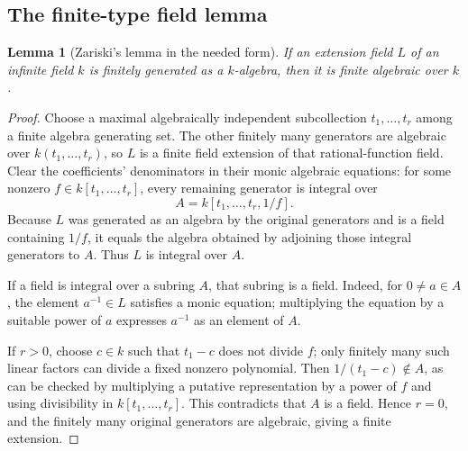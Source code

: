 \documentclass[11pt,letterpaper]{article}
\numberwithin{equation}{section}
\newtheorem{lemma}[lemma]{Lemma}
\theoremstyle{definition}
\theoremstyle{remark}
\begin{document}
\subsection{The finite-type field lemma}
\begin{lemma}[Zariski's lemma in the needed form]\label{lem:zariski}
If an extension field $L$ of an infinite field $k$ is finitely generated
as a $k$-algebra, then it is finite algebraic over $k$.
\end{lemma}
\begin{proof}
Choose a maximal algebraically independent subcollection
$t_1,\ldots,t_r$ among a finite algebra generating set. The other
finitely many generators are algebraic over $k(t_1,\ldots,t_r)$, so
$L$ is a finite field extension of that rational-function field.
Clear the coefficients' denominators in their monic algebraic equations:
for some nonzero $f\in k[t_1,\ldots,t_r]$, every remaining generator is
integral over
\[
 A=k[t_1,\ldots,t_r,1/f].
\]
Because $L$ was generated as an algebra by the original generators and is
a field containing $1/f$, it equals the algebra obtained by adjoining
those integral generators to $A$. Thus $L$ is integral over $A$.

If a field is integral over a subring $A$, that subring is a field. Indeed,
for $0\ne a\in A$, the element $a^{-1}\in L$ satisfies a monic equation;
multiplying the equation by a suitable power of $a$ expresses $a^{-1}$
as an element of $A$.

If $r>0$, choose $c\in k$ such that $t_1-c$ does not divide $f$; only
finitely many such linear factors can divide a fixed nonzero polynomial.
Then $1/(t_1-c)\notin A$, as can be checked by multiplying a putative
representation by a power of $f$ and using divisibility in
$k[t_1,\ldots,t_r]$. This contradicts that $A$ is a field. Hence $r=0$,
and the finitely many original generators are algebraic, giving a finite
extension.
\end{proof}
\end{document}
